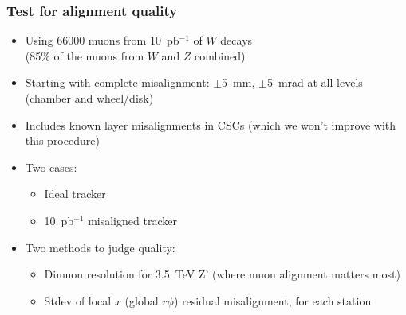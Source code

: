 \documentclass[compress]{beamer}
\begin{document}
\begin{frame}
\frametitle{Test for alignment quality}

\begin{itemize}\setlength{\itemsep}{0.1 cm}
\item Using 66000 muons from 10~pb$^{-1}$ of $W$ decays \\ (85\% of the muons from $W$ and $Z$ combined)
\item Starting with complete misalignment: $\pm$5~mm, $\pm$5~mrad at all levels (chamber and wheel/disk)
\item Includes known layer misalignments in CSCs (which we won't improve with this procedure)
\item Two cases:
\begin{itemize}
\item Ideal tracker
\item 10~pb$^{-1}$ misaligned tracker
\end{itemize}
\item Two methods to judge quality:
\begin{itemize}
\item Dimuon resolution for 3.5~TeV Z' (where muon alignment matters most)
\item Stdev of local $x$ (global $r\phi$) residual misalignment, for each station
\end{itemize}
\end{itemize}
\end{frame}
\end{document}
